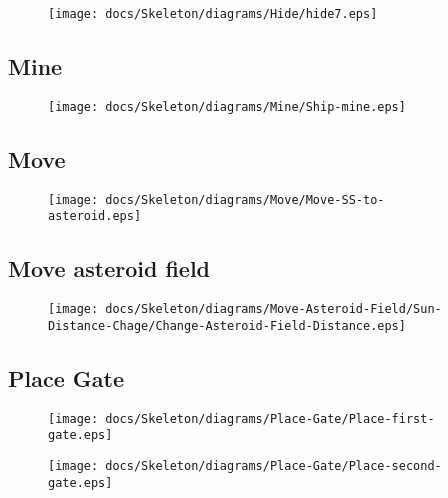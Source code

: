 \begin{figure}[H] 
    \centering 
    \texttt{[image: docs/Skeleton/diagrams/Hide/hide7.eps]} 
    \caption{} 
\end{figure} 

\subsection{Mine}

\begin{figure}[H] 
    \centering 
    \texttt{[image: docs/Skeleton/diagrams/Mine/Ship-mine.eps]} 
    \caption{} 
\end{figure} 

\subsection{Move}


\begin{figure}[H] 
    \centering 
    \texttt{[image: docs/Skeleton/diagrams/Move/Move-SS-to-asteroid.eps]} 
    \caption{} 
\end{figure} 

\subsection{Move asteroid field}

\begin{figure}[H] 
    \centering 
    \texttt{[image: docs/Skeleton/diagrams/Move-Asteroid-Field/Sun-Distance-Chage/Change-Asteroid-Field-Distance.eps]} 
    \caption{} 
\end{figure} 

\subsection{Place Gate}

\begin{figure}[H] 
    \centering 
    \texttt{[image: docs/Skeleton/diagrams/Place-Gate/Place-first-gate.eps]} 
    \caption{} 
\end{figure} 

\begin{figure}[H] 
    \centering 
    \texttt{[image: docs/Skeleton/diagrams/Place-Gate/Place-second-gate.eps]} 
    \caption{} 
\end{figure} 



